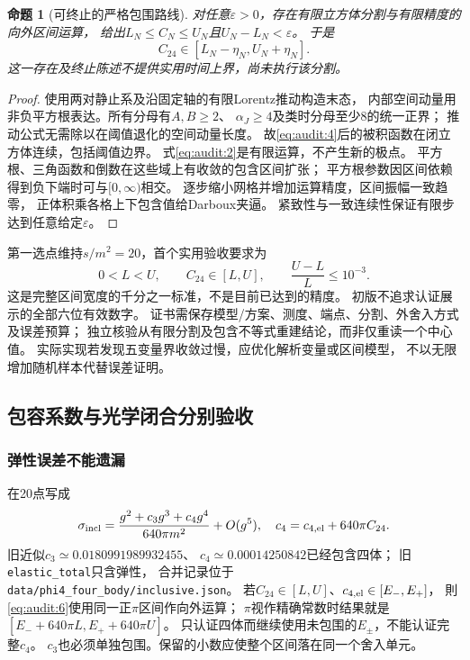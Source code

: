 \documentclass[11pt,a4paper]{ctexart}
\theoremstyle{cnplain}\newtheorem{theorem}{定理}[section]
\newtheorem{proposition}[theorem]{命题}
\theoremstyle{definition}\newtheorem{definition}[theorem]{定义}
\theoremstyle{remark}\newtheorem{remark}[theorem]{注}
\begin{document}
\begin{proposition}[可终止的严格包围路线]\label{audit:prop:boxes}
对任意$\varepsilon>0$，存在有限立方体分割与有限精度的向外区间运算，
给出$L_N\le C_N\le U_N$且$U_N-L_N<\varepsilon$。
于是
\[
 C_{24}\in[L_N-\eta_N,U_N+\eta_N].
\]
这一存在及终止陈述不提供实用时间上界，尚未执行该分割。
\end{proposition}
\begin{proof}
使用两对静止系及沿固定轴的有限Lorentz推动构造末态，
内部空间动量用非负平方根表达。所有分母有$A,B\ge2$、
$\alpha_J\ge4$及类时分母至少8的统一正界；
推动公式无需除以在阈值退化的空间动量长度。
故\eqref{eq:audit:4}后的被积函数在闭立方体连续，包括阈值边界。
式\eqref{eq:audit:2}是有限运算，不产生新的极点。
平方根、三角函数和倒数在这些域上有收敛的包含区间扩张；
平方根参数因区间依赖得到负下端时可与$[0,\infty)$相交。
逐步缩小网格并增加运算精度，区间振幅一致趋零，
正体积乘各格上下包含值给Darboux夹逼。
紧致性与一致连续性保证有限步达到任意给定$\varepsilon$。
\end{proof}

第一选点维持$s/m^2=20$，首个实用验收要求为
\begin{equation}
 0<L<U,\qquad C_{24}\in[L,U],\qquad \frac{U-L}{L}\le10^{-3}. \label{eq:audit:5}\end{equation}
这是完整区间宽度的千分之一标准，不是目前已达到的精度。
初版不追求认证展示的全部六位有效数字。
证书需保存模型/方案、测度、端点、分割、外舍入方式及误差预算；
独立核验从有限分割及包含不等式重建结论，而非仅重读一个中心值。
实际实现若发现五变量界收敛过慢，应优化解析变量或区间模型，
不以无限增加随机样本代替误差证明。

\subsection{包容系数与光学闭合分别验收}
\subsubsection{弹性误差不能遗漏}
在20点写成
\begin{equation}
 \sigma_{\rm incl}
 =\frac{g^2+c_3g^3+c_4g^4}{640\pi m^2}+O(g^5),\quad
 c_4=c_{4,\rm el}+640\pi C_{24}.                         \label{eq:audit:6}\end{equation}
旧近似$c_3\simeq0.0180991989932455$、
$c_4\simeq0.00014250842$已经包含四体；
旧\texttt{elastic\_total}只含弹性，
合并记录位于\texttt{data/phi4\_four\_body/inclusive.json}。
若$C_{24}\in[L,U]$、$c_{4,\rm el}\in[E_-,E_+]$，
則\eqref{eq:audit:6}使用同一正$\pi$区间作向外运算；
$\pi$视作精确常数时结果就是
$[E_-+640\pi L,E_++640\pi U]$。
只认证四体而继续使用未包围的$E_\pm$，不能认证完整$c_4$。
$c_3$也必须单独包围。保留的小数应使整个区间落在同一个舍入单元。
\end{document}

